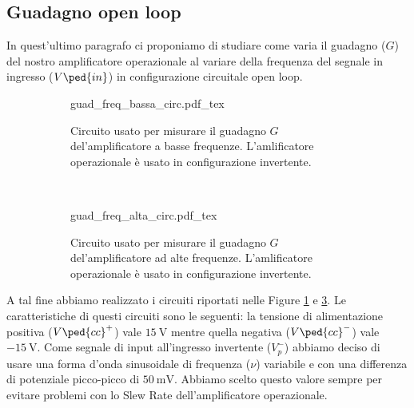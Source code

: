 \subsection*{Guadagno open loop}

In quest'ultimo paragrafo ci proponiamo di studiare come varia il guadagno ($G$) del nostro amplificatore operazionale al variare della frequenza del segnale in ingresso ($V\ped{in}$) in configurazione circuitale open loop.

\begin{figure}[h]
        \centering
        \begin{subfigure}[b]{0.45\textwidth}
        	\def\svgwidth{\textwidth}
                {guad_freq_bassa_circ.pdf_tex}
                \caption{Circuito usato per misurare il guadagno $G$ del'amplificatore a basse frequenze. L'amlificatore operazionale è usato in configurazione invertente.}
                \label{fig:G_open_loop_basso}
        \end{subfigure}
        ~
        \begin{subfigure}[b]{0.45\textwidth}
        	\def\svgwidth{\textwidth}
                {guad_freq_alta_circ.pdf_tex}
                \caption{Circuito usato per misurare il guadagno $G$ del'amplificatore ad alte frequenze. L'amlificatore operazionale è usato in configurazione invertente.}
                \label{fig:G_open_loop_alto}
        \end{subfigure}
        \caption{}
\end{figure}

A tal fine abbiamo realizzato i circuiti riportati nelle Figure \ref{fig:G_open_loop_basso} e \ref{fig:G_open_loop_alto}. Le caratteristiche di questi circuiti sono le seguenti: la tensione di alimentazione positiva ($V\ped{cc}^+$) vale $\SI{+15}{\volt}$ mentre quella negativa ($V\ped{cc}^-$) vale $\SI{-15}{\volt}$. Come segnale di input all'ingresso invertente ($V_p^-$) abbiamo deciso di usare una forma d'onda sinusoidale di frequenza ($\nu$) variabile e con una differenza di potenziale picco-picco di $\SI{50}{\milli\volt}$. Abbiamo scelto questo valore sempre per evitare problemi con lo Slew Rate dell'amplificatore operazionale.

